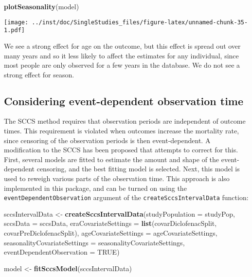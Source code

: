 \documentclass[
]{article}
\newenvironment{Shaded}{\begin{snugshade}}{\end{snugshade}}
\newcommand{\DataTypeTok}[1]{\textcolor[rgb]{0.13,0.29,0.53}{#1}}
\newcommand{\KeywordTok}[1]{\textcolor[rgb]{0.13,0.29,0.53}{\textbf{#1}}}
\newcommand{\NormalTok}[1]{#1}
\newcommand{\OtherTok}[1]{\textcolor[rgb]{0.56,0.35,0.01}{#1}}
\newcommand{\StringTok}[1]{\textcolor[rgb]{0.31,0.60,0.02}{#1}}
\begin{document}
\begin{Shaded}
\begin{Highlighting}[]
\KeywordTok{plotSeasonality}\NormalTok{(model)}
\end{Highlighting}
\end{Shaded}

\texttt{[image: ../inst/doc/SingleStudies\_files/figure-latex/unnamed-chunk-35-1.pdf]}

We see a strong effect for age on the outcome, but this effect is spread
out over many years and so it less likely to affect the estimates for
any individual, since most people are only observed for a few years in
the database. We do not see a strong effect for season.

\hypertarget{considering-event-dependent-observation-time}{%
\subsection{Considering event-dependent observation
time}\label{considering-event-dependent-observation-time}}

The SCCS method requires that observation periods are independent of
outcome times. This requirement is violated when outcomes increase the
mortality rate, since censoring of the observation periods is then
event-dependent. A modification to the SCCS has been proposed that
attempts to correct for this. First, several models are fitted to
estimate the amount and shape of the event-dependent censoring, and the
best fitting model is selected. Next, this model is used to reweigh
various parts of the observation time. This approach is also implemented
in this package, and can be turned on using the
\texttt{eventDependentObservation} argument of the
\texttt{createSccsIntervalData} function:

\begin{Shaded}
\begin{Highlighting}[]
\NormalTok{sccsIntervalData <-}\StringTok{ }\KeywordTok{createSccsIntervalData}\NormalTok{(}\DataTypeTok{studyPopulation =}\NormalTok{ studyPop,}
                                           \DataTypeTok{sccsData =}\NormalTok{ sccsData,}
                                           \DataTypeTok{eraCovariateSettings =} \KeywordTok{list}\NormalTok{(covarDiclofenacSplit,}
\NormalTok{                                                                       covarPreDiclofenacSplit),}
                                           \DataTypeTok{ageCovariateSettings =}\NormalTok{ ageCovariateSettings,}
                                           \DataTypeTok{seasonalityCovariateSettings =}\NormalTok{ seasonalityCovariateSettings,}
                                           \DataTypeTok{eventDependentObservation =} \OtherTok{TRUE}\NormalTok{)}

\NormalTok{model <-}\StringTok{ }\KeywordTok{fitSccsModel}\NormalTok{(sccsIntervalData)}
\end{Highlighting}
\end{Shaded}
\end{document}
